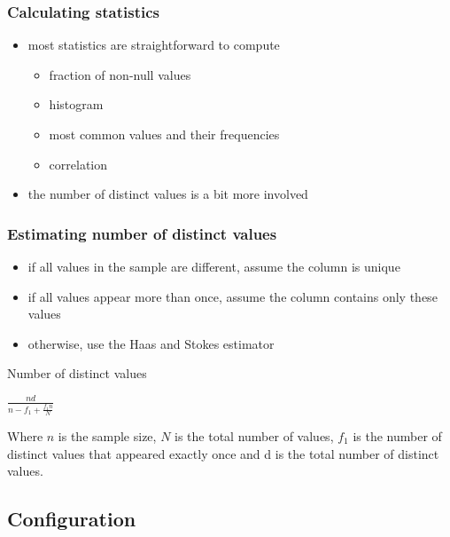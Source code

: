 \documentclass{beamer}
\begin{document}
\begin{frame}
  \frametitle{Calculating statistics}

  \begin{itemize}
  \item most statistics are \alert{straightforward} to compute
    \begin{itemize}
    \item fraction of non-null values
    \item histogram
    \item most common values and their frequencies
    \item correlation
    \end{itemize}
  \item the number of \alert{distinct values} is a bit more involved
  \end{itemize}
\end{frame}

\begin{frame}
  \frametitle{Estimating number of distinct values}

  \begin{itemize}
  \item if all values in the sample are different, assume the column is \alert{unique}
  \item if all values appear more than once, assume the column contains
    \alert{only these values}
  \item otherwise, use the \alert{Haas and Stokes estimator}
  \end{itemize}

  \begin{block}{Number of distinct values}
    \begin{center}
      $\frac{n d}{n - f_1 + \frac{f_1 n}{N}}$
    \end{center}
    Where $n$ is the sample size, $N$ is the total number of values, $f_1$ is
    the number of distinct values that appeared exactly once and d is the total
    number of distinct values.
  \end{block}
\end{frame}

\subsection{Configuration}
\end{document}
